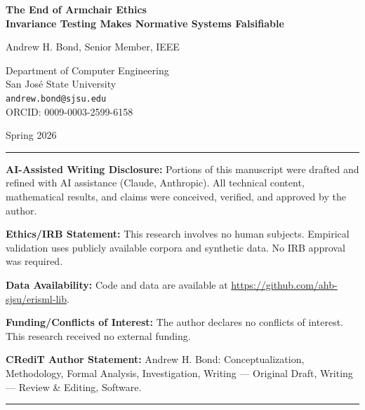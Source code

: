 \documentclass[12pt,letterpaper]{article}
\begin{document}
\begin{titlepage}
\centering
\vspace*{2cm}

{\LARGE\bfseries The End of Armchair Ethics\\
\largeHow Invariance Testing Makes Normative Systems Falsifiable\par}

\vspace{2cm}

{\large Andrew H. Bond, Senior Member, IEEE\par}
\vspace{0.5cm}
{\normalsize Department of Computer Engineering\\
San Jos\'{e} State University\\
\texttt{andrew.bond@sjsu.edu}\\
ORCID: 0009-0003-2599-6158\par}

\vspace{1cm}

{\normalsize Spring 2026\par}

\vfill

\noindent\rule{\textwidth}{0.4pt}
\small

\noindent\textbf{AI-Assisted Writing Disclosure:} Portions of this manuscript were drafted and refined with AI assistance (Claude, Anthropic). All technical content, mathematical results, and claims were conceived, verified, and approved by the author.

\vspace{0.5em}
\noindent\textbf{Ethics/IRB Statement:} This research involves no human subjects. Empirical validation uses publicly available corpora and synthetic data. No IRB approval was required.

\vspace{0.5em}
\noindent\textbf{Data Availability:} Code and data are available at \url{https://github.com/ahb-sjsu/erisml-lib}.

\vspace{0.5em}
\noindent\textbf{Funding/Conflicts of Interest:} The author declares no conflicts of interest. This research received no external funding.

\vspace{0.5em}
\noindent\textbf{CRediT Author Statement:} Andrew H. Bond: Conceptualization, Methodology, Formal Analysis, Investigation, Writing --- Original Draft, Writing --- Review \& Editing, Software.

\normalsize
\noindent\rule{\textwidth}{0.4pt}

\end{titlepage}
\end{document}
